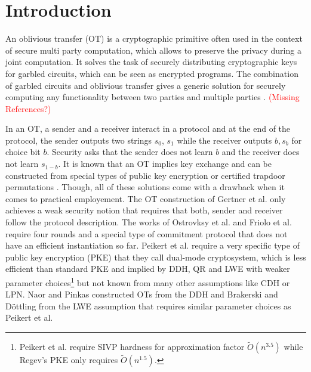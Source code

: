 \newcommand{\msng}{\textcolor{red}{(Missing References?)}}

\section{Introduction}

An oblivious transfer (OT) \cite{Rabin81,C:EveGolLem82} is a cryptographic primitive often used in the context of secure multi party computation, which allows to preserve the privacy during a joint computation. It solves the task of securely distributing cryptographic keys for garbled circuits, which can be seen as encrypted programs. The combination of garbled circuits and oblivious transfer gives a generic solution for securely computing any functionality between two parties \cite{FOCS:Yao82b,FOCS:Yao86,STOC:Kilian88,C:IshPraSah08} and multiple parties \cite{C:CreVanTap95,EC:BenLin18,EC:GarSri18a}. \msng  

In an OT, a sender and a receiver interact in a protocol and at the end of the protocol, the sender outputs two strings $s_0$, $s_1$ while the receiver outputs $b, s_b$ for choice bit $b$. Security asks that the sender does not learn $b$ and the receiver does not learn $s_{1-b}$. It is known that an OT implies key exchange and can be constructed from special types of public key encryption \cite{FOCS:GKMRV00,C:PeiVaiWat08,cryptoeprint:2018:473} or certified trapdoor permutations \cite{C:OstRicSca15}. Though, all of these solutions come with a drawback when it comes to practical employement. The OT construction of Gertner et al. \cite{FOCS:GKMRV00} only achieves a weak security notion that requires that both, sender and receiver follow the protocol description. The works of Ostrovksy et al. \cite{C:OstRicSca15} and Friolo et al. \cite{cryptoeprint:2018:473} require four rounds and a special type of commitment protocol \cite{STOC:Kilian92,C:OstRicSca15} that does not have an efficient instantiation so far. Peikert et al. \cite{C:PeiVaiWat08} require a very specific type of public key encryption (PKE) that they call dual-mode cryptosystem, which is less efficient than standard PKE and implied by DDH, QR and LWE with weaker parameter choices\footnote{Peikert et al. require SIVP hardness for approximation factor $\tilde{O}(n^{3.5})$ while Regev's PKE \cite{STOC:Regev05} only requires $\tilde{O}(n^{1.5})$.} but not known from many other assumptions like CDH or LPN. Naor and Pinkas \cite{SODA:NaoPin01} constructed OTs from the DDH and Brakerski and D\"ottling \cite{TCC:BraDot18} from the LWE assumption that requires similar parameter choices as Peikert et al.

